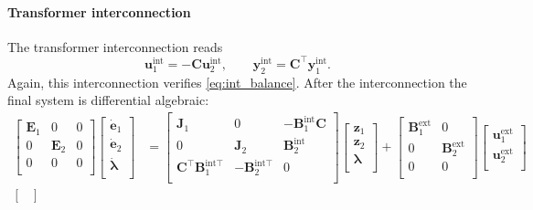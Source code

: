 \documentclass{svjour3}                     %
\begin{document}
\paragraph{Transformer interconnection}
The transformer interconnection reads
\begin{equation*}
\mathbf{u}_1^{\text{int}} = -\mathbf{C} \mathbf{u}_2^{\text{int}}, \qquad
\mathbf{y}_2^{\text{int}} = \mathbf{C}^\top \mathbf{y}_1^{\text{int}}.
\end{equation*}
Again, this interconnection verifies \eqref{eq:int_balance}. After the interconnection the final system is differential algebraic:
\begin{align*}
\begin{bmatrix}
\mathbf{E}_1 & 0 & 0 \\ 
0 & \mathbf{E}_2 & 0 \\
0 & 0 & 0 \\
\end{bmatrix}
\begin{bmatrix}
\dot{\mathbf{e}}_1 \\ \dot{\mathbf{e}}_2 \\ \dot{\bm{\lambda}} \\
\end{bmatrix} &= 
\begin{bmatrix}
\mathbf{J}_1 & 0 & -\mathbf{B}_1^{\text{int}} \mathbf{C} \\ 
0 & \mathbf{J}_2 & \mathbf{B}_2^{\text{int}} \\
\mathbf{C}^\top \mathbf{B}_1^{\text{int} \top} & - \mathbf{B}_2^{\text{int} \top} & 0 \\
\end{bmatrix}
\begin{bmatrix}
\mathbf{z}_1 \\ 
\mathbf{z}_2 \\
\bm{\lambda} \\
\end{bmatrix}+ 
\begin{bmatrix}
\mathbf{B}_1^{\text{ext}} & 0 \\ 0 & \mathbf{B}_2^{\text{ext}} \\ 0 & 0 \\
\end{bmatrix} 
\begin{bmatrix}
\mathbf{u}_1^{\text{ext}} \\ 
\mathbf{u}_2^{\text{ext}} \\
\end{bmatrix} \\
\begin{bmatrix}

\end{bmatrix}
\end{align*}
\end{document}
